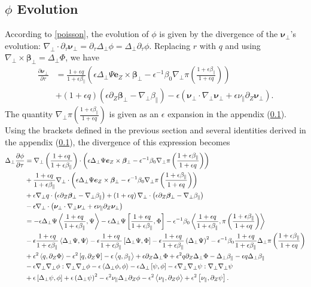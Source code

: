 \documentclass{article}
\newcommand{\para}{\parallel}
\newcommand{\ep}{\epsilon}
\newcommand{\np}{\nabla_\perp}
\newcommand{\lap}{\Delta_\perp}
\newcommand{\p}{\partial}
\newcommand{\deriv}[2]{\frac{\p #1}{\p #2}}
\newcommand{\fr}{\frac{1+\ep q}{1+\ep\beta_\para}}
\newcommand{\frinv}{\frac{1+\ep\beta_\para}{1+\ep q}}
\newcommand{\pth} [1] {\left( #1 \right) }
\newcommand{\br} [1] {\left[ #1 \right] }
\begin{document}
\subsection{$\phi$ Evolution}
According to \eqref{poisson}, the evolution of $\phi$ is given by the divergence of the $\bm{\nu}_\perp$'s evolution: $\np\cdot\p_\tau\bm{\nu}_\perp = \p_\tau\lap\phi = \lap\p_\tau\phi$. Replacing $r$ with $q$ and using $\np\times\bm{\beta}_\perp = \lap\Phi$, we have
\begin{align*}
    \deriv{\bm{\nu}_\perp}{\tau} 
    &= \fr\pth{\ep\lap\Psi\bm{e}_Z\times\bm{\beta}_\perp - \ep^{-1}\beta_0\np\pi\pth{\frinv}} \\
    &+ \pth{1+\ep q} \pth{\ep\p_Z\bm{\beta}_\perp - \np\beta_\para} - \ep\pth{\bm{\nu}_\perp\cdot\np\bm{\nu}_\perp + \ep\nu_\para\p_Z\bm{\nu}_\perp}.
\end{align*}
The quantity $\np\pi\pth{\frinv}$ is given as an $\ep$ expansion in the appendix (\ref{}). Using the brackets defined in the previous section and several identities derived in the appendix (\ref{}), the divergence of this expression becomes
\begin{align}
    \lap\deriv{\phi}{\tau} &= \np\pth{\fr}\cdot\pth{\ep\lap\Psi\bm{e}_Z\times\bm{\beta}_\perp - \ep^{-1}\beta_0\np\pi\pth{\frinv}} \nonumber\\
    &+ \fr\np\cdot\pth{\ep\lap\Psi\bm{e}_Z\times\bm{\beta}_\perp - \ep^{-1}\beta_0\np\pi\pth{\frinv}} \nonumber\\
    &+ \ep\np q\cdot\pth{\ep\p_Z\bm{\beta}_\perp - \np\beta_\para} + \pth{1+\ep q}\np\cdot\pth{\ep\p_Z\bm{\beta}_\perp - \np\beta_\para} \nonumber\\
    &- \ep\np\cdot\pth{\bm{\nu}_\perp\cdot\np\bm{\nu}_\perp + \ep\nu_\para\p_Z\bm{\nu}_\perp} \nonumber\\
    &= -\ep\lap\Psi\Braket{\fr, \Psi} - \ep\lap\Psi\br{\fr, \Phi} - \ep^{-1}\beta_0\Braket{\fr, \pi\pth{\frinv}} \nonumber\\ 
    &- \ep\fr\Braket{\lap\Psi, \Psi} - \ep\fr\br{\lap\Psi, \Phi} - \ep\fr\pth{\lap\Psi}^2 - \ep^{-1}\beta_0\fr\lap\pi\pth{\frinv} \nonumber\\
    &+ \ep^2\Braket{q, \p_Z\Phi} - \ep^2\br{q, \p_Z\Psi} - \ep\Braket{q,\beta_\para} + \ep\p_Z\lap\Phi + \ep^2q\p_Z\lap\Phi - \lap\beta_\para - \ep q\lap\beta_\para \nonumber\\ 
    &- \ep\np\np\phi:\np\np\phi - \ep\Braket{\lap\phi, \phi} - \ep\lap\br{\psi,\phi} - \ep\np\np\psi:\np\np\psi \nonumber\\
    &+ \ep\br{\lap\psi, \phi} + \ep\pth{\lap\psi}^2 - \ep^2\nu_\para \lap\p_Z\phi - \ep^2\Braket{\nu_\para, \p_Z\phi} + \ep^2\br{\nu_\para, \p_Z\psi}.
\end{align}
\end{document}

